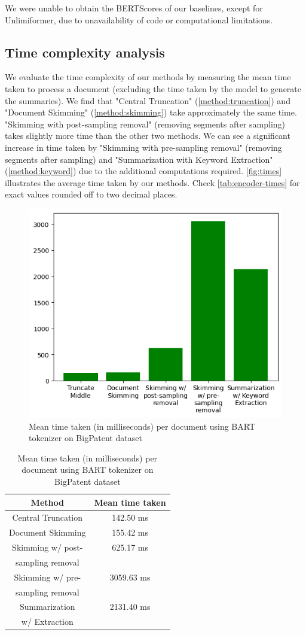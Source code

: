 We were unable to obtain the BERTScores of our baselines, except for Unlimiformer, due to unavailability of code or computational limitations.


\subsection*{Time complexity analysis}

We evaluate the time complexity of our methods by measuring the mean time taken to process a document (excluding the time taken by the model to generate the summaries).
We find that "Central Truncation" (\autoref{method:truncation}) and "Document Skimming" (\autoref{method:skimming}) take approximately the same time.
"Skimming with post-sampling removal" (removing segments after sampling) takes slightly more time than the other two methods.
We can see a significant increase in time taken by "Skimming with pre-sampling removal" (removing segments after sampling) and "Summarization with Keyword Extraction" (\autoref{method:keyword}) due to the additional computations required.
\autoref{fig:times} illustrates the average time taken by our methods.
Check \autoref{tab:encoder-times} for exact values rounded off to two decimal places.

\begin{figure}[!ht]
  \centering
  \includegraphics[width=.48\textwidth]{images/encoder-times.png}
  \caption{Mean time taken (in milliseconds) per document using BART tokenizer on BigPatent dataset}
  \label{fig:times}
\end{figure}

\begin{table}[!ht]
  \centering

  \begin{tabular}{c c}
    \hline
    Method & Mean time taken \\
    \hline
    Central Truncation & 142.50 ms \\
    Document Skimming & 155.42 ms \\
    Skimming w/ post- & 625.17 ms \\
    sampling removal & \\
    Skimming w/ pre- & 3059.63 ms \\
    sampling removal & \\
    Summarization & 2131.40 ms \\
    w/ Extraction & \\
    \hline
  \end{tabular}

  \caption{Mean time taken (in milliseconds) per document using BART tokenizer on BigPatent dataset}
  \label{tab:encoder-times}
\end{table}
